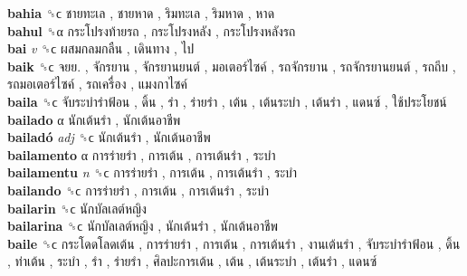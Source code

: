 \textbf{bahia} ␝ϲ   ชายทะเล ,  ชายหาด ,  ริมทะเล ,  ริมหาด ,  หาด   \\
\textbf{bahul} ␝α   กระโปรงท้ายรถ ,  กระโปรงหลัง ,  กระโปรงหลังรถ   \\
\textbf{bai} \emph{v}  ␝ϲ   ผสมกลมกลืน ,  เดินทาง ,  ไป   \\
\textbf{baik} ␝ϲ   จยย. ,  จักรยาน ,  จักรยานยนต์ ,  มอเตอร์ไซค์ ,  รถจักรยาน ,  รถจักรยานยนต์ ,  รถถีบ ,  รถมอเตอร์ไซค์ ,  รถเครื่อง ,  แมงกาไซค์   \\
\textbf{baila} ␝ϲ   จับระบำรำฟ้อน ,  ดิ้น ,  รำ ,  ร่ายรำ ,  เต้น ,  เต้นระบำ ,  เต้นรำ ,  แดนซ์ ,  ใช้ประโยชน์   \\
\textbf{bailado} α   นักเต้นรำ ,  นักเต้นอาชีพ   \\
\textbf{bailadó} \emph{adj}  ␝ϲ   นักเต้นรำ ,  นักเต้นอาชีพ   \\
\textbf{bailamento} α   การร่ายรำ ,  การเต้น ,  การเต้นรำ ,  ระบำ   \\
\textbf{bailamentu} \emph{n}  ␝ϲ   การร่ายรำ ,  การเต้น ,  การเต้นรำ ,  ระบำ   \\
\textbf{bailando} ␝ϲ   การร่ายรำ ,  การเต้น ,  การเต้นรำ ,  ระบำ   \\
\textbf{bailarin} ␝ϲ   นักบัลเลต์หญิง   \\
\textbf{bailarina} ␝ϲ   นักบัลเลต์หญิง ,  นักเต้นรำ ,  นักเต้นอาชีพ   \\
\textbf{baile} ␝ϲ   กระโดดโลดเต้น ,  การร่ายรำ ,  การเต้น ,  การเต้นรำ ,  งานเต้นรำ ,  จับระบำรำฟ้อน ,  ดิ้น ,  ท่าเต้น ,  ระบำ ,  รำ ,  ร่ายรำ ,  ศิลปะการเต้น ,  เต้น ,  เต้นระบำ ,  เต้นรำ ,  แดนซ์   \\
